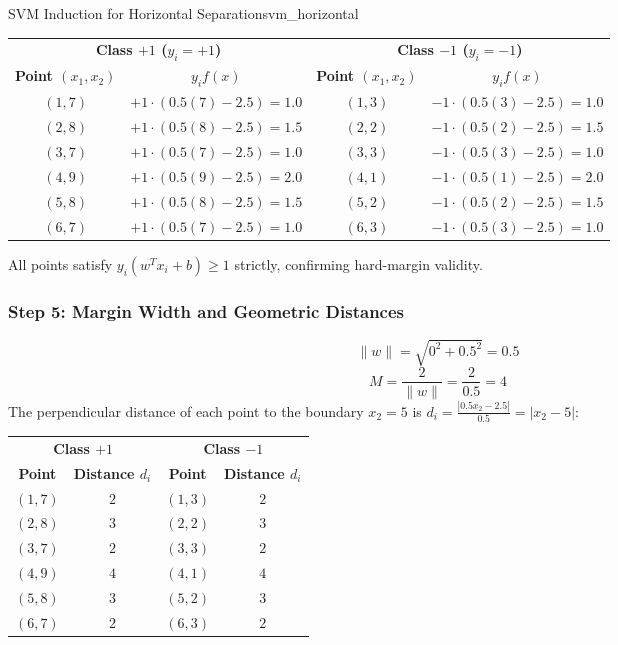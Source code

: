 \begin{example}{SVM Induction for Horizontal Separation}{svm_horizontal}
\begin{center}\small
\begin{tabular}{cc|cc}
\toprule
\multicolumn{2}{c|}{\textbf{Class $+1$ ($y_i = +1$)}} & \multicolumn{2}{c}{\textbf{Class $-1$ ($y_i = -1$)}} \\
\textbf{Point $(x_1, x_2)$} & $y_i f(x)$ & \textbf{Point $(x_1, x_2)$} & $y_i f(x)$ \\
\midrule
$(1, 7)$ & $+1 \cdot (0.5(7) - 2.5) = 1.0$ & $(1, 3)$ & $-1 \cdot (0.5(3) - 2.5) = 1.0$ \\
$(2, 8)$ & $+1 \cdot (0.5(8) - 2.5) = 1.5$ & $(2, 2)$ & $-1 \cdot (0.5(2) - 2.5) = 1.5$ \\
$(3, 7)$ & $+1 \cdot (0.5(7) - 2.5) = 1.0$ & $(3, 3)$ & $-1 \cdot (0.5(3) - 2.5) = 1.0$ \\
$(4, 9)$ & $+1 \cdot (0.5(9) - 2.5) = 2.0$ & $(4, 1)$ & $-1 \cdot (0.5(1) - 2.5) = 2.0$ \\
$(5, 8)$ & $+1 \cdot (0.5(8) - 2.5) = 1.5$ & $(5, 2)$ & $-1 \cdot (0.5(2) - 2.5) = 1.5$ \\
$(6, 7)$ & $+1 \cdot (0.5(7) - 2.5) = 1.0$ & $(6, 3)$ & $-1 \cdot (0.5(3) - 2.5) = 1.0$ \\
\bottomrule
\end{tabular}
\end{center}
All points satisfy $y_i(w^T x_i + b) \ge 1$ strictly, confirming hard-margin validity.

\subsubsection{Step 5: Margin Width and Geometric Distances}
\begin{equation}
\|w\| = \sqrt{0^2 + 0.5^2} = 0.5
\end{equation}
\begin{equation}
M = \frac{2}{\|w\|} = \frac{2}{0.5} = 4
\end{equation}
The perpendicular distance of each point to the boundary $x_2 = 5$ is $d_i = \frac{|0.5 x_2 - 2.5|}{0.5} = |x_2 - 5|$:

\begin{center}\small
\begin{tabular}{cc|cc}
\toprule
\multicolumn{2}{c|}{\textbf{Class $+1$}} & \multicolumn{2}{c}{\textbf{Class $-1$}} \\
\textbf{Point} & \textbf{Distance $d_i$} & \textbf{Point} & \textbf{Distance $d_i$} \\
\midrule
$(1, 7)$ & $2$ & $(1, 3)$ & $2$ \\
$(2, 8)$ & $3$ & $(2, 2)$ & $3$ \\
$(3, 7)$ & $2$ & $(3, 3)$ & $2$ \\
$(4, 9)$ & $4$ & $(4, 1)$ & $4$ \\
$(5, 8)$ & $3$ & $(5, 2)$ & $3$ \\
$(6, 7)$ & $2$ & $(6, 3)$ & $2$ \\
\bottomrule
\end{tabular}
\end{center}


\end{example}
